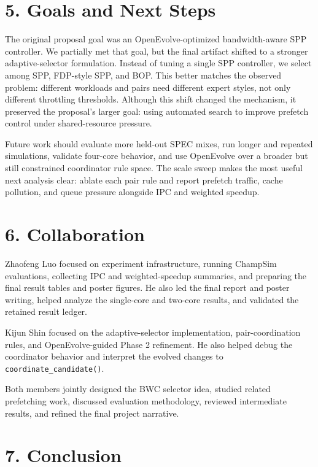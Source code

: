 \documentclass[10pt,letterpaper]{article}
\newcommand{\code}[1]{\texttt{#1}}
\begin{document}
\section*{5. Goals and Next Steps}

The original proposal goal was an OpenEvolve-optimized bandwidth-aware SPP
controller. We partially met that goal, but the final artifact shifted to a
stronger adaptive-selector formulation. Instead of tuning a single SPP
controller, we select among SPP, FDP-style SPP, and BOP. This better matches
the observed problem: different workloads and pairs need different expert
styles, not only different throttling thresholds. Although this shift changed
the mechanism, it preserved the proposal's larger goal: using automated search
to improve prefetch control under shared-resource pressure.

Future work should evaluate more held-out SPEC mixes, run longer and repeated
simulations, validate four-core behavior, and use OpenEvolve over a broader
but still constrained coordinator rule space. The scale sweep makes the most
useful next analysis clear: ablate each pair rule and report prefetch traffic,
cache pollution, and queue pressure alongside IPC and weighted speedup.

\section*{6. Collaboration}

Zhaofeng Luo focused on experiment infrastructure, running ChampSim
evaluations, collecting IPC and weighted-speedup summaries, and preparing the
final result tables and poster figures. He also led the final report and poster
writing, helped analyze the single-core and two-core results, and validated the
retained result ledger.

Kijun Shin focused on the adaptive-selector implementation, pair-coordination
rules, and OpenEvolve-guided Phase 2 refinement. He also helped debug the
coordinator behavior and interpret the evolved changes to
\code{coordinate\_candidate()}.

Both members jointly designed the BWC selector idea, studied related
prefetching work, discussed evaluation methodology, reviewed intermediate
results, and refined the final project narrative.

\section*{7. Conclusion}
\end{document}
